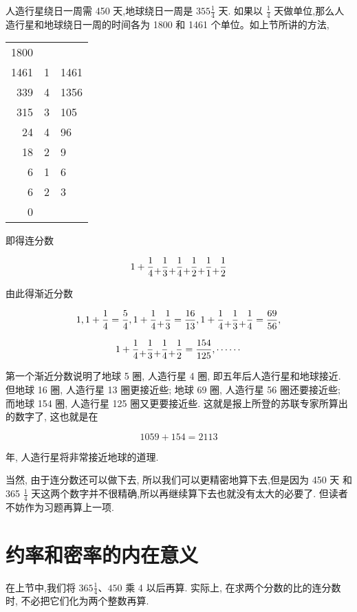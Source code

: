 \documentclass{ctexart}
\newcommand{\cplus}{\raisebox{-1ex}{+}}
\begin{document}
人造行星绕日一周需 450 天,地球绕日一周是 \({355}\frac{1}{4}\) 天. 如果以 \(\frac{1}{4}\) 天做单位,那么人造行星和地球绕日一周的时间各为 1800 和 1461 个单位。如上节所讲的方法,
\begin{table}[h]
  \centering
\begin{tabular}{r|l|l}
1800 &   &      \\
1461 & 1 & 1461 \\ \cline{1-1}
339  & 4 & 1356 \\ \cline{3-3} 
315  & 3 & 105  \\ \cline{1-1}
24   & 4 & 96   \\ \cline{3-3} 
18   & 2 & 9    \\ \cline{1-1}
6    & 1 & 6    \\ \cline{3-3} 
6    & 2 & 3    \\ \cline{1-1}
0    &   &     
\end{tabular}
\end{table}

即得连分数

\[
1 + \frac{1}{4} \cplus \frac{1}{3} \cplus \frac{1}{4} \cplus \frac{1}{2} \cplus \frac{1}{1} \cplus \frac{1}{2}
\]

由此得渐近分数

\[
1,1 + \frac{1}{4} = \frac{5}{4},1 + \frac{1}{4} \cplus \frac{1}{3} = \frac{16}{13},1 + \frac{1}{4} \cplus \frac{1}{3} \cplus \frac{1}{4} = \frac{69}{56},
\]

\[
1 + \frac{1}{4} \cplus \frac{1}{3} \cplus \frac{1}{4} \cplus \frac{1}{2} = \frac{154}{125},\cdots \cdots
\]

第一个渐近分数说明了地球 5 圈, 人造行星 4 圈, 即五年后人造行星和地球接近. 但地球 16 圈, 人造行星 13 圈更接近些; 地球 69 圈, 人造行星 56 圈还要接近些; 而地球 154 圈, 人造行星 125 圈又更要接近些. 这就是报上所登的苏联专家所算出的数字了, 这也就是在

\[
{1059} + {154} = {2113}
\]

年, 人造行星将非常接近地球的道理.

当然, 由于连分数还可以做下去, 所以我们可以更精密地算下去,但是因为 450 天 和 365 \(\frac{1}{4}\) 天这两个数字并不很精确,所以再继续算下去也就没有太大的必要了. 但读者不妨作为习题再算上一项.

\section{约率和密率的内在意义}

在上节中,我们将 \({365}\frac{1}{4}\text{、}{450}\) 乘 4 以后再算. 实际上, 在求两个分数的比的连分数时, 不必把它们化为两个整数再算.
\end{document}
